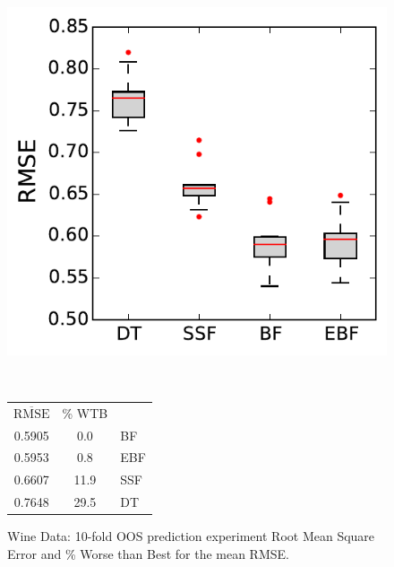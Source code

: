 \documentclass{article}
\begin{document}
\begin{figure}
\begin{minipage}{0.5\linewidth}
\includegraphics[width=\textwidth]{../graphs/wine}
\end{minipage}
~~
\begin{minipage}{0.4\linewidth}
{\footnotesize
\begin{tabular}{c c | l}
$\overline{\text{RMSE}}$  & \% WTB & \\
\cline{1-2}\rule{0pt}{3ex} 
0.5905 &  0.0 & BF \\
0.5953 &  0.8 & EBF \\
0.6607 & 11.9 & SSF \\
0.7648 & 29.5 & DT \\
\end{tabular}}
\end{minipage}
\caption{\label{wine}Wine Data: 10-fold OOS prediction experiment Root Mean Square Error and \% Worse than Best for the mean RMSE. }

\end{figure}
\end{document}
